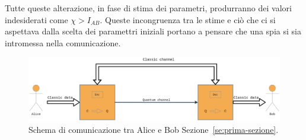 Tutte queste alterazione, in fase di stima dei parametri, produrranno dei valori indesiderati come $\chi > I_{AB}$. Queste incongruenza tra le stime e ci\`o che ci si aspettava dalla scelta dei paramettri iniziali portano a pensare che una spia si sia intromessa nella comunicazione. 

\begin{figure}[h] 
\begin{center}
\includegraphics[width=\textwidth]{figure/alice_bob_communication.eps} 
\end{center}
\caption{Schema di comunicazione tra Alice e Bob Sezione~\ref{se:prima-sezione}.} \label{fig:figura-doppia}
\end{figure}

